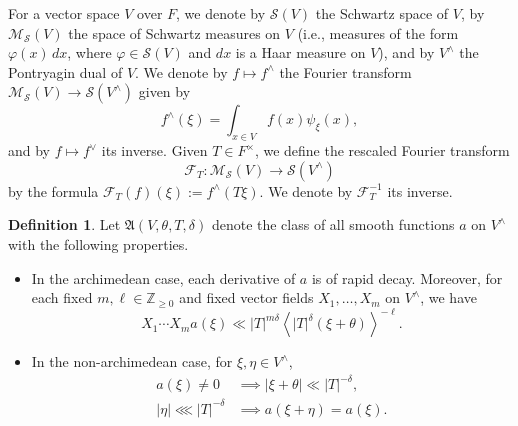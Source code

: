 \documentclass[reqno]{amsart}
\theoremstyle{plain} \newtheorem{theorem} {Theorem}
\theoremstyle{definition} \newtheorem{definition} [theorem] {Definition}
\theoremstyle{itplain} %
\numberwithin{equation}{section}
\numberwithin{theorem}{section}
\renewcommand{\geq}{\geqslant}
\begin{document}
For a vector space $V$ over $F$, we denote by $\mathcal{S}(V)$ the Schwartz space of $V$, by $\mathcal{M}_{\mathcal{S}}(V)$ the space of Schwartz measures on $V$ (i.e., measures of the form $\varphi(x) \, d x$, where $\varphi \in \mathcal{S}(V)$ and $d x$ is a Haar measure on $V$), and by $V^\wedge$ the Pontryagin dual of $V$.  We denote by $f \mapsto f^\wedge$ the Fourier transform $\mathcal{M}_{\mathcal{S}}(V) \rightarrow \mathcal{S}(V^\wedge)$ given by
\begin{equation*}
  f^\wedge(\xi) = \int_{x \in V} f(x) \psi_\xi(x),
\end{equation*}
and by $f \mapsto f^\vee$ its inverse.  Given $T \in F^\times$, we define the rescaled Fourier transform
\begin{equation*}
  \mathcal{F}_T : \mathcal{M}_{\mathcal{S}}(V) \rightarrow \mathcal{S}(V^\wedge)
\end{equation*}
by the formula $\mathcal{F}_T(f)(\xi) := f^\wedge(T \xi)$.  We denote by $\mathcal{F}_T^{-1}$ its inverse.


\begin{definition}\label{defn:let-mathfrakav-theta}
  Let $\mathfrak{A}(V,\theta,T,\delta)$ denote the class of all smooth functions $a$ on $V^\wedge$ with the following properties.
  \begin{itemize}
  \item In the archimedean case, each derivative of $a$ is of rapid decay.  Moreover, for each fixed $m, \ell \in \mathbb{Z}_{\geq 0}$ and fixed vector fields $X_1,\dotsc,X_m$ on $V^\wedge$, we have
    \begin{equation*}
      X_1 \dotsb X_m a(\xi) \ll |T|^{m \delta} \left\langle |T|^{\delta} (\xi + \theta ) \right\rangle^{-\ell}.
    \end{equation*}
  \item In the non-archimedean case, for $\xi, \eta \in V^\wedge$,
    \begin{align*}
      a(\xi ) \neq 0 &\implies |\xi + \theta| \ll |T|^{-\delta}, \\
      |\eta| \lll |T|^{-\delta} &\implies a(\xi + \eta  ) = a(\xi).
    \end{align*}
  \end{itemize}
\end{definition}
\end{document}
